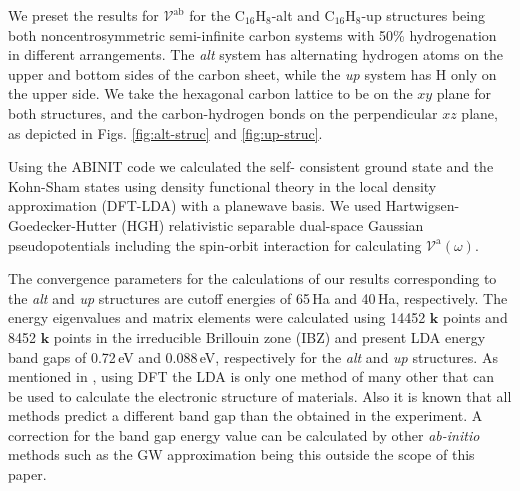 \documentclass[prb,11pt,tightenlines,twocolumn,aps]{revtex4-1}
\begin{document}
We preset the results for $\mathcal{V}^{\mathrm{ab}}$ for the
C$_{16}$H$_{8}$-alt and C$_{16}$H$_{8}$-up structures being both
noncentrosymmetric semi-infinite carbon systems with 50\% hydrogenation in
different arrangements. The \emph{alt} system has alternating hydrogen atoms on
the upper and bottom sides of the carbon sheet, while the \emph{up} system has H
only on the upper side. We take the hexagonal carbon lattice to be on the $xy$
plane for both structures, and the carbon-hydrogen bonds on the perpendicular
$xz$ plane, as depicted in Figs.
\ref{fig:alt-struc} and \ref{fig:up-struc}.

Using the ABINIT code \cite{gonzeCPC09} we calculated the self- consistent
ground state and the Kohn-Sham states using density functional theory in the
local density approximation (DFT-LDA) with a planewave basis. We used
Hartwigsen- Goedecker-Hutter (HGH) relativistic separable dual-space Gaussian
pseudopotentials \cite{hartwigsenPRB98} including the spin-orbit interaction
for calculating $\mathcal{V}^{\mathrm{a}}(\omega)$.

The convergence parameters for the calculations of our results corresponding to
the \emph{alt} and \emph{up} structures are cutoff energies of 65\,Ha and
40\,Ha, respectively. The energy eigenvalues and matrix elements were
calculated using 14452 $\mathbf{k}$ points and 8452 $\mathbf{k}$ points in the
irreducible Brillouin zone (IBZ) and present LDA energy band gaps of 0.72\,eV
and 0.088\,eV, respectively for the \emph{alt} and \emph{up} structures. As
mentioned in
\cite{zapataPSB2016}, using DFT the LDA is only one method of many other that
can be used to calculate the electronic structure of materials. Also it is
known that all methods predict a different band gap than the obtained in the
experiment. A correction for the band gap energy value can be calculated by
other \emph{ab-initio} methods such as the GW approximation \cite{onidaRMP02}
being this outside the scope of this paper.
\end{document}
